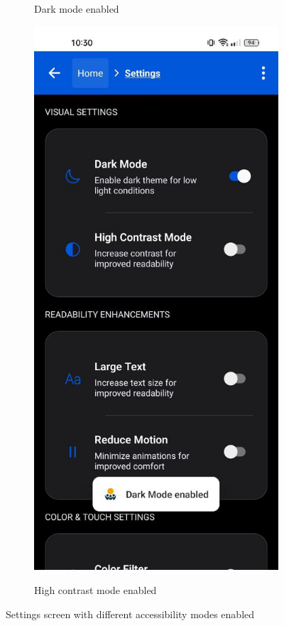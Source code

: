 \begin{enumerate}
\begin{figure}[ht]
\begin{subfigure}[b]{0.48\textwidth}
        \caption{Dark mode enabled}
        \label{fig:settings-dark}
    \end{subfigure}
    \hfill
    \begin{subfigure}[b]{0.48\textwidth}
        \centering
        \includegraphics[width=\linewidth, alt={Settings screen with high contrast mode enabled}]{img/settings4.jpg}
        \caption{High contrast mode enabled}
        \label{fig:settings-contrast}
    \end{subfigure}
    \caption{Settings screen with different accessibility modes enabled}
    \label{fig:settings_modes}
\end{figure}


\end{enumerate}
